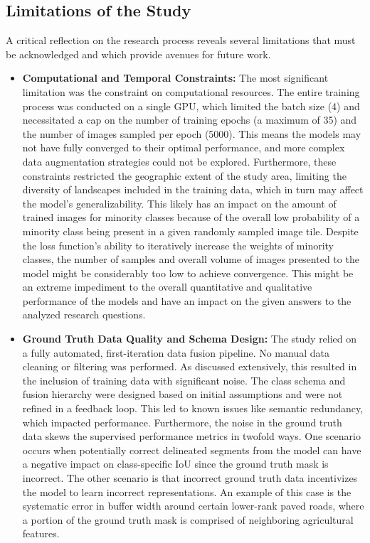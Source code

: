 \documentclass{report}
\begin{document}
\subsection{Limitations of the Study}
\label{sec:study_limitations}
A critical reflection on the research process reveals several limitations that must be acknowledged and which provide avenues for future work.
\begin{itemize}
\item \textbf{Computational and Temporal Constraints:} The most significant limitation was the constraint on computational resources. The entire training process was conducted on a single GPU, which limited the batch size (4) and necessitated a cap on the number of training epochs (a maximum of 35) and the number of images sampled per epoch (5000). This means the models may not have fully converged to their optimal performance, and more complex data augmentation strategies could not be explored. Furthermore, these constraints restricted the geographic extent of the study area, limiting the diversity of landscapes included in the training data, which in turn may affect the model's generalizability. This likely has an impact on the amount of trained images for minority classes because of the overall low probability of a minority class being present in a given randomly sampled image tile. Despite the loss function's ability to iteratively increase the weights of minority classes, the number of samples and overall volume of images presented to the model might be considerably too low to achieve convergence. This might be an extreme impediment to the overall quantitative and qualitative performance of the models and have an impact on the given answers to the analyzed research questions.
\item \textbf{Ground Truth Data Quality and Schema Design:} The study relied on a fully automated, first-iteration data fusion pipeline. No manual data cleaning or filtering was performed. As discussed extensively, this resulted in the inclusion of training data with significant noise. The class schema and fusion hierarchy were designed based on initial assumptions and were not refined in a feedback loop. This led to known issues like semantic redundancy, which impacted performance. Furthermore, the noise in the ground truth data skews the supervised performance metrics in twofold ways. One scenario occurs when potentially correct delineated segments from the model can have a negative impact on class-specific IoU since the ground truth mask is incorrect. The other scenario is that incorrect ground truth data incentivizes the model to learn incorrect representations. An example of this case is the systematic error in buffer width around certain lower-rank paved roads, where a portion of the ground truth mask is comprised of neighboring agricultural features.

\end{itemize}
\end{document}
